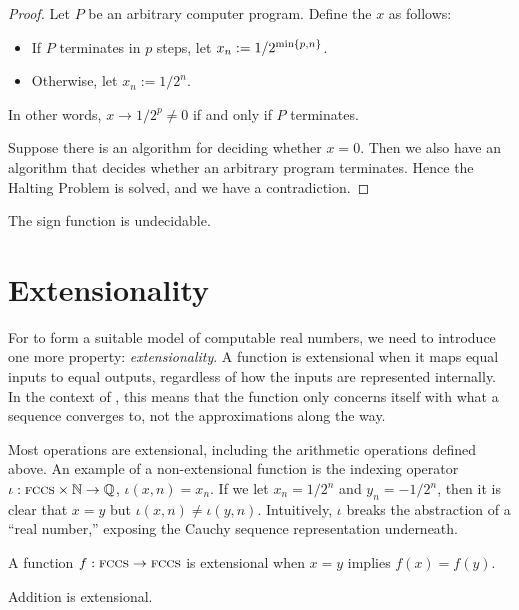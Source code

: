 \documentclass[leqno]{report}
\begin{document}
\begin{proof}
    Let $P$ be an arbitrary computer program. Define the \FCCS{} $x$ as follows:
    \begin{itemize}
        \item If $P$ terminates in $p$ steps, let $x_n := 1/2^{\min\left\{ p, n \right\}}$.
        \item Otherwise, let $x_n := 1/2^n$.
    \end{itemize}
    In other words, $x \rightarrow 1/2^p \neq 0$ if and only if $P$ terminates.

    Suppose there is an algorithm for deciding whether $x = 0$. Then we also have an algorithm that decides whether an arbitrary program terminates. Hence the Halting Problem is solved, and we have a contradiction.
\end{proof}

\begin{Corollary}
    The sign function is undecidable.
\end{Corollary}

\section{Extensionality}

For \FCCS{} to form a suitable model of computable real numbers, we need to introduce one more property: \textit{extensionality}. A function is extensional when it maps equal inputs to equal outputs, regardless of how the inputs are represented internally. In the context of \FCCS, this means that the function only concerns itself with what a sequence converges to, not the approximations along the way.

Most operations are extensional, including the arithmetic operations defined above. An example of a non-extensional function is the indexing operator $\iota : \textsc{fccs} \times \mathbb{N} \rightarrow \mathbb{Q}$, $\iota(x, n) = x_n$. If we let $x_n = 1/2^n$ and $y_n = -1/2^n$, then it is clear that $x = y$ but $\iota(x, n) \neq \iota(y, n)$. Intuitively, $\iota$ breaks the abstraction of a ``real number,'' exposing the Cauchy sequence representation underneath.

\begin{Definition}[Extensionality]
    A function $f : \textsc{fccs} \rightarrow \textsc{fccs}$ is extensional when $x = y$ implies $f(x) = f(y)$.
\end{Definition}

\begin{Proposition}
    Addition is extensional.
\end{Proposition}
\end{document}
